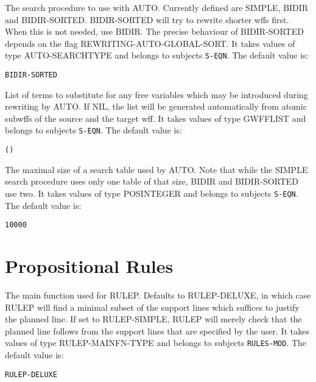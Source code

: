 \begin{description}
\item[REWRITING-AUTO-SEARCH-TYPE]  
The search procedure to use with AUTO. Currently defined are SIMPLE,
BIDIR and BIDIR-SORTED. BIDIR-SORTED will try to rewrite shorter wffs first.
When this is not needed, use BIDIR. The precise behaviour of BIDIR-SORTED
depends on the flag REWRITING-AUTO-GLOBAL-SORT.
It takes values of type AUTO-SEARCHTYPE and belongs to subjects \texttt{S-EQN}.  The default value is: \begin{lstlisting}
BIDIR-SORTED
\end{lstlisting}

\item[REWRITING-AUTO-SUBSTS]  
List of terms to substitute for any free variables which may be
introduced during rewriting by AUTO. If NIL, the list will be generated
automatically from atomic subwffs of the source and the target wff.
It takes values of type GWFFLIST and belongs to subjects \texttt{S-EQN}.  The default value is: \begin{lstlisting}
()
\end{lstlisting}

\item[REWRITING-AUTO-TABLE-SIZE]  
The maximal size of a search table used by AUTO. Note that while the
SIMPLE search procedure uses only one table of that size, BIDIR and
BIDIR-SORTED use two.
It takes values of type POSINTEGER and belongs to subjects \texttt{S-EQN}.  The default value is: \begin{lstlisting}
10000
\end{lstlisting}

\item
\end{description}

\section{Propositional Rules}

\begin{description} 
\item[RULEP-MAINFN]  
The main function used for RULEP.  Defaults to RULEP-DELUXE, in
which case RULEP will find a minimal subset of the support lines
which suffices to justify the planned line.  If set to RULEP-SIMPLE,
RULEP will merely check that the planned line follows from the
support lines that are specified by the user.
It takes values of type RULEP-MAINFN-TYPE and belongs to subjects \texttt{RULES-MOD}.  The default value is: \begin{lstlisting}
RULEP-DELUXE
\end{lstlisting}

\item
\end{description}

